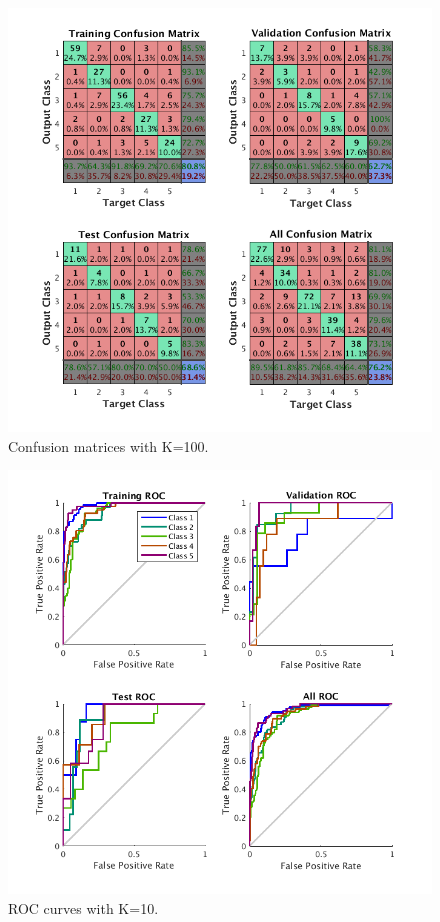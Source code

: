 \documentclass{article}
\begin{document}
\begin{figure}[Ht]
\centering
\includegraphics[scale=0.5]{Figures/Metrics/conf_k100}
\caption{Confusion matrices with K=100.}
\label{fig:k100}
\end{figure}
\begin{figure}[Ht]
\centering
\includegraphics[scale=0.5]{Figures/Metrics/roc_k10}
\caption{ROC curves with K=10.}
\label{fig:r10}
\end{figure}
\end{document}
